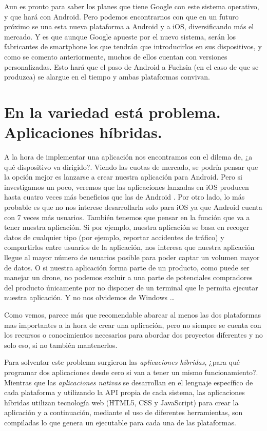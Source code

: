 Aun es pronto para saber los planes que tiene Google con este sistema operativo, y que hará con Android. Pero podemos encontrarnos con que en un futuro próximo se una esta nueva plataforma a Android y a iOS, diversificando más el mercado. Y es que aunque Google apueste por el nuevo sistema, serán los fabricantes de smartphone los que tendrán que introducirlos en sus dispositivos, y como se comento anteriormente, muchos de ellos cuentan con versiones personalizadas. Esto hará que el paso de Android a Fuchsia (en el caso de que se produzca) se alargue en el tiempo y ambas plataformas convivan.

\section{En la variedad está problema. Aplicaciones híbridas.}

A la hora de implementar una aplicación nos encontramos con el dilema de, ¿a qué dispositivo va dirigido?. Viendo las cuotas de mercado, se podría pensar que la opción mejor es lanzarse a crear nuestra aplicación para Android. Pero si investigamos un poco, veremos que las aplicaciones lanzadas en iOS producen hasta cuatro veces más beneficios que las de Android \cite{AndroidiOSRevenue}. Por otro lado, lo más probable es que no nos interese desarrollarla solo para iOS ya que Android cuenta con 7 veces más usuarios. También tenemos que pensar en la función que va a tener nuestra aplicación. Si por ejemplo, nuestra aplicación se basa en recoger datos de cualquier tipo (por ejemplo, reportar accidentes de tráfico) y compartirlos entre usuarios de la aplicación, nos interesa que nuestra aplicación llegue al mayor número de usuarios posible para poder captar un volumen mayor de datos. O si nuestra aplicación forma parte de un producto, como puede ser manejar un drone, no podemos excluir a una parte de potenciales compradores del producto únicamente por no disponer de un terminal que le permita ejecutar nuestra aplicación. Y no nos olvidemos de Windows \ldots

Como vemos, parece más que recomendable abarcar al menos las dos plataformas mas importantes a la hora de crear una aplicación, pero no siempre se cuenta con los recursos o conocimientos necesarios para abordar dos proyectos diferentes y no solo eso, si no también mantenerlos.

Para solventar este problema surgieron las \emph{aplicaciones híbridas}, ¿para qué programar dos aplicaciones desde cero si van a tener un mismo funcionamiento?. Mientras que las \emph{aplicaciones nativas} se desarrollan en el lenguaje específico de cada plataforma y utilizando la \gls{API} propia de cada sistema, las aplicaciones híbridas utilizan tecnología web (HTML5, CSS y JavaScript) para crear la aplicación y a continuación, mediante el uso de diferentes herramientas, son compiladas lo que genera un ejecutable para cada una de las plataformas.

